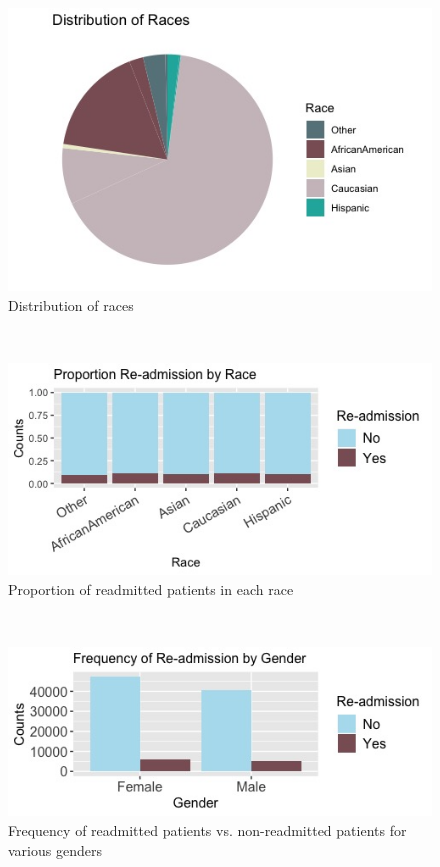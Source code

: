 \documentclass[letterpaper, 10 pt, conference]{ieeeconf}  %
\begin{document}
\begin{figure}[!hbt]
\centering
\includegraphics[width=1\columnwidth]{Rplot04.png}
\caption{Distribution of races}
\label{race}
\end{figure}\\

\begin{figure}[!hbt]
\centering
\includegraphics[width=1\columnwidth]{Rplot05.png}
\caption{Proportion of readmitted patients in each race}
\label{raceprop}
\end{figure}\\

\begin{figure}[!hbt]
\centering
\includegraphics[width=1\columnwidth]{Rplot06.png}
\caption{Frequency of readmitted patients vs. non-readmitted patients for various genders}
\label{gender}
\end{figure}\\
\end{document}
